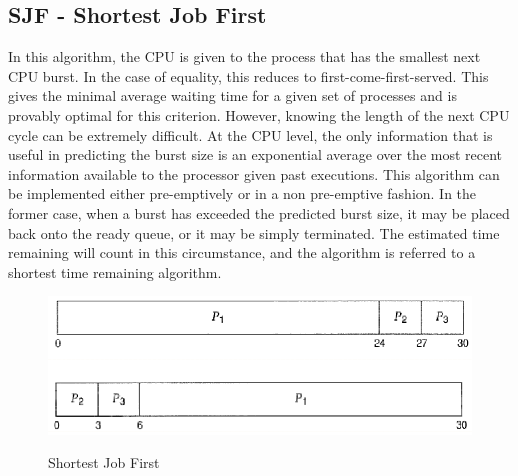 \documentclass[10pt,a4paper]{article}
\begin{document}
\subsection{SJF - Shortest Job First}
In this algorithm, the CPU is given to the process that has the smallest next CPU burst. In the case of equality, this reduces to first-come-first-served. This gives the minimal average waiting time for a given set of processes and is provably optimal for this criterion. However, knowing the length of the next CPU cycle can be extremely difficult. At the CPU level, the only information that is useful in predicting the burst size is an exponential average over the most recent information available to the processor given past executions. This algorithm can be implemented either pre-emptively or in a non pre-emptive fashion. In the former case, when a burst has exceeded the predicted burst size, it may be placed back onto the ready queue, or it may be simply terminated. The estimated time remaining will count in this circumstance, and the algorithm is referred to a shortest time remaining algorithm.  
\begin{figure}
\caption{Shortest Job First \cite{OSCONCEPTS}}
\begin{center}
\includegraphics[scale=0.45]{../images/fcfs-sched.png}
\label{fcfs}
\end{center}
\end{figure}
\end{document}
